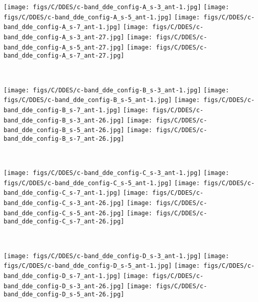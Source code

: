 \begin{figure*}
\begin{minipage}[t]{1\linewidth}
\centering
\texttt{[image: figs/C/DDES/c-band\_dde\_config-A\_s-3\_ant-1.jpg]}
\texttt{[image: figs/C/DDES/c-band\_dde\_config-A\_s-5\_ant-1.jpg]}
\texttt{[image: figs/C/DDES/c-band\_dde\_config-A\_s-7\_ant-1.jpg]}
\texttt{[image: figs/C/DDES/c-band\_dde\_config-A\_s-3\_ant-27.jpg]}
\texttt{[image: figs/C/DDES/c-band\_dde\_config-A\_s-5\_ant-27.jpg]}
\texttt{[image: figs/C/DDES/c-band\_dde\_config-A\_s-7\_ant-27.jpg]}
\end{minipage}
~\\
\begin{minipage}[t]{1\linewidth}\centering
\texttt{[image: figs/C/DDES/c-band\_dde\_config-B\_s-3\_ant-1.jpg]}
\texttt{[image: figs/C/DDES/c-band\_dde\_config-B\_s-5\_ant-1.jpg]}
\texttt{[image: figs/C/DDES/c-band\_dde\_config-B\_s-7\_ant-1.jpg]}
\texttt{[image: figs/C/DDES/c-band\_dde\_config-B\_s-3\_ant-26.jpg]}
\texttt{[image: figs/C/DDES/c-band\_dde\_config-B\_s-5\_ant-26.jpg]}
\texttt{[image: figs/C/DDES/c-band\_dde\_config-B\_s-7\_ant-26.jpg]}
\end{minipage}
~\\
\begin{minipage}[t]{1\linewidth}\centering
\texttt{[image: figs/C/DDES/c-band\_dde\_config-C\_s-3\_ant-1.jpg]}
\texttt{[image: figs/C/DDES/c-band\_dde\_config-C\_s-5\_ant-1.jpg]}
\texttt{[image: figs/C/DDES/c-band\_dde\_config-C\_s-7\_ant-1.jpg]}
\texttt{[image: figs/C/DDES/c-band\_dde\_config-C\_s-3\_ant-26.jpg]}
\texttt{[image: figs/C/DDES/c-band\_dde\_config-C\_s-5\_ant-26.jpg]}
\texttt{[image: figs/C/DDES/c-band\_dde\_config-C\_s-7\_ant-26.jpg]}
\end{minipage}
~\\
\begin{minipage}[t]{1\linewidth}\centering
\texttt{[image: figs/C/DDES/c-band\_dde\_config-D\_s-3\_ant-1.jpg]}
\texttt{[image: figs/C/DDES/c-band\_dde\_config-D\_s-5\_ant-1.jpg]}
\texttt{[image: figs/C/DDES/c-band\_dde\_config-D\_s-7\_ant-1.jpg]}
\texttt{[image: figs/C/DDES/c-band\_dde\_config-D\_s-3\_ant-26.jpg]}
\texttt{[image: figs/C/DDES/c-band\_dde\_config-D\_s-5\_ant-26.jpg]}

\end{minipage}
\end{figure*}
